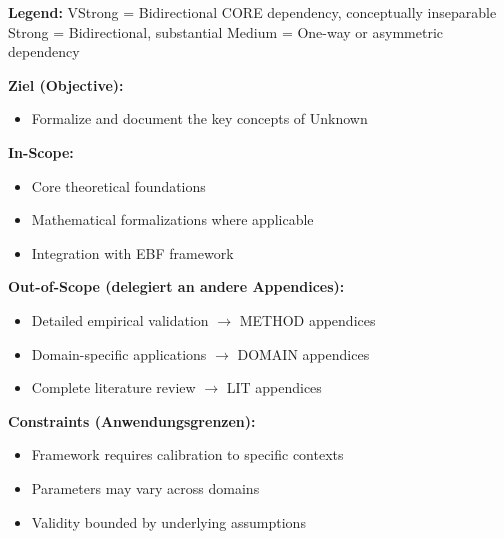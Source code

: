 \begin{tcolorbox}[colback=white, colframe=black,
    title=\textbf{10C Integration: How HI CORE-HIERARCHY Connects to Other COREs}]
\begin{description}[style=nextline, labelindent=0pt, leftmargin=1.5cm]
\end{description}

\textbf{Legend:}
\colorbox{red!20}{VStrong} = Bidirectional CORE dependency, conceptually inseparable \quad
\colorbox{red!20}{Strong} = Bidirectional, substantial \quad
\colorbox{yellow!20}{Medium} = One-way or asymmetric dependency

\end{tcolorbox}


\begin{tcolorbox}[
    colback=orange!5!white,
    colframe=orange!75!black,
    title={\textbf{Appendix Scope: Ziel / In-Scope / Out-of-Scope / Constraints}},
    fonttitle=\bfseries
]

\textbf{Ziel (Objective):}
\begin{itemize}[nosep]
    \item Formalize and document the key concepts of Unknown
\end{itemize}

\textbf{In-Scope:}
\begin{itemize}[nosep]
    \item Core theoretical foundations
    \item Mathematical formalizations where applicable
    \item Integration with EBF framework
\end{itemize}

\textbf{Out-of-Scope (delegiert an andere Appendices):}
\begin{itemize}[nosep]
    \item Detailed empirical validation $\rightarrow$ METHOD appendices
    \item Domain-specific applications $\rightarrow$ DOMAIN appendices
    \item Complete literature review $\rightarrow$ LIT appendices
\end{itemize}

\textbf{Constraints (Anwendungsgrenzen):}
\begin{itemize}[nosep]
    \item Framework requires calibration to specific contexts
    \item Parameters may vary across domains
    \item Validity bounded by underlying assumptions
\end{itemize}


\end{tcolorbox}
